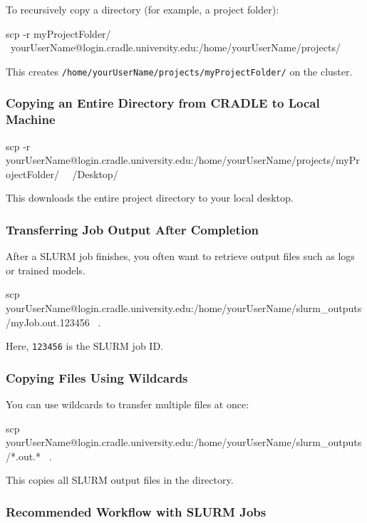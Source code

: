 \documentclass[11pt]{article}
\begin{document}
To recursively copy a directory (for example, a project folder):

\begin{codeblock}
scp -r myProjectFolder/ \
    yourUserName@login.cradle.university.edu:/home/yourUserName/projects/
\end{codeblock}

This creates \texttt{/home/yourUserName/projects/myProjectFolder/} on the cluster.

\subsubsection{Copying an Entire Directory from CRADLE to Local Machine}

\begin{codeblock}
scp -r yourUserName@login.cradle.university.edu:/home/yourUserName/projects/myProjectFolder/ \
    ~/Desktop/
\end{codeblock}

This downloads the entire project directory to your local desktop.

\subsubsection{Transferring Job Output After Completion}

After a SLURM job finishes, you often want to retrieve output files such as logs
or trained models.

\begin{codeblock}
scp yourUserName@login.cradle.university.edu:/home/yourUserName/slurm_outputs/myJob.out.123456 \
    .
\end{codeblock}

Here, \texttt{123456} is the SLURM job ID.

\subsubsection{Copying Files Using Wildcards}

You can use wildcards to transfer multiple files at once:

\begin{codeblock}
scp yourUserName@login.cradle.university.edu:/home/yourUserName/slurm_outputs/*.out.* \
    .
\end{codeblock}

This copies all SLURM output files in the directory.

\subsubsection{Recommended Workflow with SLURM Jobs}
\end{document}
